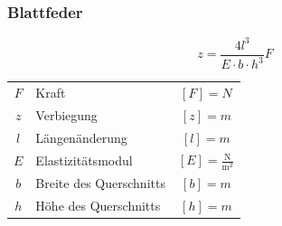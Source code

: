 		\subsubsection{Blattfeder}
		
			$$ \boxed{ z = \frac{4l^3}{E \cdot b \cdot h^3}F }$$ 

			\begin{tabular}{c l c}
				$F$ & Kraft & $[F] = N$ \\
				$z$ & Verbiegung & $[z] = m$ \\
				$l$ & Längenänderung & $[l] = m$ \\
				$E$ & Elastizitätsmodul & $[E] = \mathrm{\frac{N}{m^2}}$ \\
				$b$ & Breite des Querschnitts & $[b] = m$ \\
				$h$ & Höhe des Querschnitts & $[h] = m$ \\
			\end{tabular}

